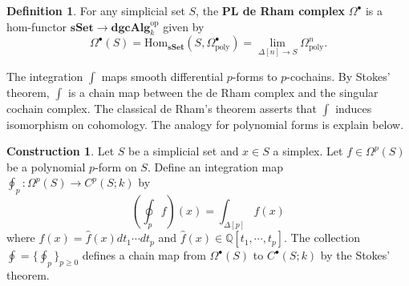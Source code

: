 \documentclass[psamsfonts]{amsart}
\theoremstyle{definition}
\newtheorem{defn}{Definition}[section]
\newtheorem{con}{Construction}[section]
\newcommand{\Q}{\mathbb{Q}}
\newcommand{\sSet}{\mathbf{sSet}}
\newcommand{\dgcAlg}{\mathbf{dgcAlg}}
\newcommand{\Hom}{\mathrm{Hom}}
\numberwithin{equation}{section}
\begin{document}
\begin{defn}
For any simplicial set $S$, the \textbf{PL de Rham complex} $\Omega^\bullet$ is a hom-functor $\sSet\to\dgcAlg_k^\mathrm{op}$ given by
\[\Omega^\bullet(S)=\Hom_\sSet(S,\Omega^\bullet_\textrm{poly})=\textstyle{\lim_{\Delta[n]\to S}\Omega^n_\textrm{poly}}.\]
\end{defn}

The integration $\int$ maps smooth differential $p$-forms to $p$-cochains. By Stokes' theorem, $\int$ is a chain map between the de Rham complex and the singular cochain complex. The classical de Rham's theorem asserts that $\int$ induces isomorphism on cohomology. The analogy for polynomial forms is explain below.

\begin{con}
Let $S$ be a simplicial set and $x\in S$ a simplex. Let $f\in\Omega^p(S)$ be a polynomial $p$-form on $S$. Define an integration map $\oint_p:\Omega^p(S)\to C^p(S;k)$ by
\[(\oint_pf)(x)=\int_{\Delta[p]}f(x)\]
where $f(x)=\hat{f}(x)dt_1\cdots dt_p$ and $\hat{f}(x)\in\Q[t_1,\cdots,t_p]$. The collection $\oint=\{\oint_p\}_{p\geq0}$ defines a chain map from $\Omega^\bullet(S)$ to $C^\bullet(S;k)$ by the Stokes' theorem.
\end{con}
\end{document}

